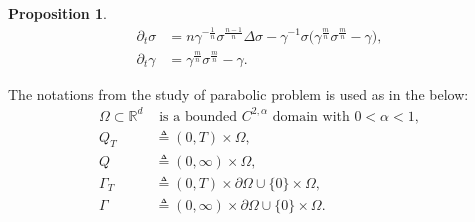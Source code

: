 \documentclass[a4paper,11pt]{article}
\newtheorem{proposition}{Proposition}[section]
\theoremstyle{remark}
\begin{document}
\begin{proposition}
 \begin{equation}\label{Aux2}
\begin{aligned}
 \partial_t \sigma &= n\gamma^{-\frac{1}{n}}\sigma^{\frac{n-1}{n}} \Delta \sigma - \gamma^{-1}\sigma\Big(\gamma^{\frac{m}{n}}\sigma^{\frac{m}{n}}-\gamma\Big) ,\\
 \partial_t \gamma &= \gamma^{\frac{m}{n}}\sigma^{\frac{m}{n}} - \gamma. 
\end{aligned}
\end{equation}
\end{proposition}







The notations from the study of parabolic problem is used as in the below:
\begin{align*}
 \Omega \subset \mathbb{R}^d& \text{ is a bounded $C^{2,\alpha}$ domain with $0<\alpha <1$},\\
 Q_T &\triangleq (0,T)\times \Omega,\\
 Q &\triangleq (0,\infty)\times \Omega,\\
 \Gamma_T &\triangleq (0,T)\times \partial\Omega \cup \{0\}\times\Omega,\\
 \Gamma &\triangleq (0,\infty)\times \partial\Omega \cup \{0\}\times\Omega. 
\end{align*}
\end{document}
